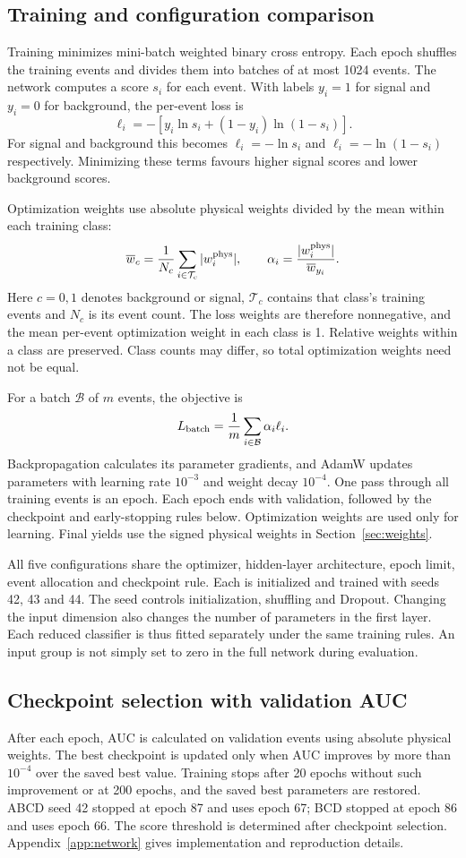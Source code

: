 \documentclass[11pt,a4paper]{article}
\begin{document}
\subsection{Training and configuration comparison}
Training minimizes mini-batch weighted binary cross entropy.
Each epoch shuffles the training events and divides them into batches of at most 1024 events. The network computes a score $s_i$ for each event.
With labels $y_i=1$ for signal and $y_i=0$ for background, the per-event loss is
\[
 \ell_i=-\left[y_i\ln s_i+(1-y_i)\ln(1-s_i)\right].
\]
For signal and background this becomes $\ell_i=-\ln s_i$ and $\ell_i=-\ln(1-s_i)$ respectively.
Minimizing these terms favours higher signal scores and lower background scores.

Optimization weights use absolute physical weights divided by the mean within each training class:
\[
 \overline w_c=\frac{1}{N_c}\sum_{i\in\mathcal T_c}|w_i^{\rm phys}|,
 \qquad
 \alpha_i=\frac{|w_i^{\rm phys}|}{\overline w_{y_i}}.
\]
Here $c=0,1$ denotes background or signal, $\mathcal T_c$ contains that class's training events and $N_c$ is its event count.
The loss weights are therefore nonnegative, and the mean per-event optimization weight in each class is 1. Relative weights within a class are preserved.
Class counts may differ, so total optimization weights need not be equal.

For a batch $\mathcal B$ of $m$ events, the objective is
\[
 L_{\rm batch}=\frac{1}{m}\sum_{i\in\mathcal B}\alpha_i\ell_i.
\]
Backpropagation calculates its parameter gradients, and AdamW updates parameters with learning rate $10^{-3}$ and weight decay $10^{-4}$.
One pass through all training events is an epoch. Each epoch ends with validation, followed by the checkpoint and early-stopping rules below.
Optimization weights are used only for learning. Final yields use the signed physical weights in Section~\ref{sec:weights}.

All five configurations share the optimizer, hidden-layer architecture, epoch limit, event allocation and checkpoint rule.
Each is initialized and trained with seeds 42, 43 and 44.
The seed controls initialization, shuffling and Dropout. Changing the input dimension also changes the number of parameters in the first layer.
Each reduced classifier is thus fitted separately under the same training rules. An input group is not simply set to zero in the full network during evaluation.

\subsection{Checkpoint selection with validation AUC}
After each epoch, AUC is calculated on validation events using absolute physical weights.
The best checkpoint is updated only when AUC improves by more than $10^{-4}$ over the saved best value.
Training stops after 20 epochs without such improvement or at 200 epochs, and the saved best parameters are restored.
ABCD seed 42 stopped at epoch 87 and uses epoch 67; BCD stopped at epoch 86 and uses epoch 66.
The score threshold is determined after checkpoint selection.
Appendix~\ref{app:network} gives implementation and reproduction details.
\end{document}
